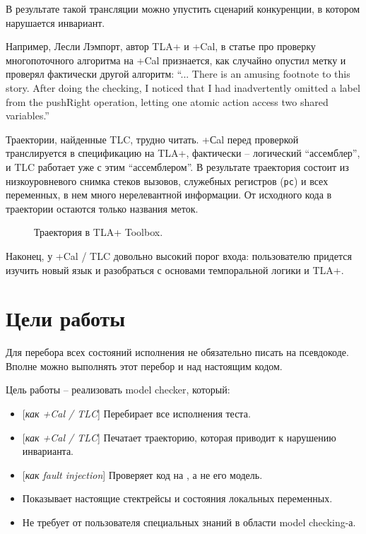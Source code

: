 В результате такой трансляции можно упустить сценарий конкуренции, в котором нарушается инвариант.

Например, Лесли Лэмпорт, автор TLA+ и +Cal, в статье про проверку многопоточного алгоритма на +Cal признается, как случайно опустил метку и проверял фактически другой алгоритм: “... There is an amusing footnote to this story. After doing the checking, I noticed that I had inadvertently omitted a label from the pushRight operation, letting one atomic action access two shared variables.” \autocite{LamportPLuscal}

Траектории, найденные TLC, трудно читать. +Сal перед проверкой транслируется в спецификацию на TLA+, фактически – логический “ассемблер”, и TLC работает уже с этим “ассемблером”. В результате траектория состоит из низкоуровневого снимка стеков вызовов, служебных регистров (\texttt{pc}) и всех переменных, в нем много нерелевантной информации. От исходного кода в траектории остаются только названия меток.

\begin{figure}
	\bigskip
	\caption{Траектория в TLA+ Toolbox.}\label{fig:caltrace}
\end{figure}

Наконец, у +Cal / TLC довольно высокий порог входа: пользователю придется изучить новый язык и разобраться с основами темпоральной логики и TLA+.

\section{Цели работы}

Для перебора всех состояний исполнения не обязательно писать на псевдокоде. Вполне можно выполнять этот перебор и над настоящим кодом. 

Цель работы – реализовать model checker, который:

\begin{itemize}
\item	{[}\emph{как +Cal / TLC}{]} Перебирает все исполнения теста.

\item	{[}\emph{как +Cal / TLC}{]} Печатает траекторию, которая приводит к нарушению инварианта. 

\item	{[}\emph{как fault injection}{]} Проверяет код на \CC, а не его модель.

\item	Показывает настоящие стектрейсы и состояния локальных переменных. 

\item	Не требует от пользователя специальных знаний в области model checking-а.
\end{itemize}

